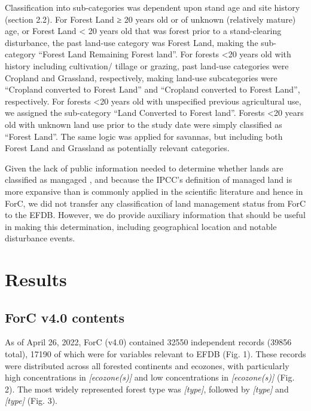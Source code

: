 \documentclass[, manuscript]{copernicus}
\begin{document}
Classification into sub-categories was dependent upon stand age and site
history (section 2.2). For Forest Land ≥ 20 years old or of unknown
(relatively mature) age, or Forest Land \textless{} 20 years old that
was forest prior to a stand-clearing disturbance, the past land-use
category was Forest Land, making the sub-category ``Forest Land
Remaining Forest land''. For forests \textless20 years old with history
including cultivation/ tillage or grazing, past land-use categories were
Cropland and Grassland, respectively, making land-use subcategories were
``Cropland converted to Forest Land'' and ``Cropland converted to Forest
Land'', respectively. For forests \textless20 years old with unspecified
previous agricultural use, we assigned the sub-category ``Land Converted
to Forest land''. Forests \textless20 years old with unknown land use
prior to the study date were simply classified as ``Forest Land''. The
same logic was applied for savannas, but including both Forest Land and
Grassland as potentially relevant categories.

Given the lack of public information needed to determine whether lands
are classified as mangaged
\citep{ogle_delineating_2018, deng_comparing_2021}, and because the
IPCC's definition of managed land is more expansive than is commonly
applied in the scientific literature and hence in ForC, we did not
transfer any classification of land management status from ForC to the
EFDB. However, we do provide auxiliary information that should be useful
in making this determination, including geographical location and
notable disturbance events.

\section{Results}

\subsection{ForC v4.0 contents}

As of April 26, 2022, ForC (v4.0) contained 32550 independent records
(39856 total), 17190 of which were for variables relevant to EFDB (Fig.
1). These records were distributed across all forested continents and
ecozones, with particularly high concentrations in
\emph{{[}ecozone(s){]}} and low concentrations in
\emph{{[}ecozone(s){]}} (Fig. 2). The most widely represented forest
type was \emph{{[}type{]}}, followed by \emph{{[}type{]}} and
\emph{{[}type{]}} (Fig. 3).
\end{document}
